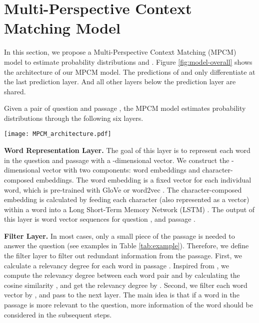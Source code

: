 \documentclass[11pt,letterpaper]{article}
\begin{document}
\section{Multi-Perspective Context Matching Model}
\label{sec:model}
In this section, we propose a Multi-Perspective Context Matching (MPCM) model to 
estimate probability distributions  and . 
Figure \ref{fig:model-overall} shows the architecture of our MPCM model. 
The predictions of  and  only differentiate at the last prediction layer.
And all other layers below the prediction layer are shared.

Given a pair of question  and passage , the MPCM model estimates probability distributions through the following six layers.

\begin{figure*}[tbp]
\begin{center}
\texttt{[image: MPCM\_architecture.pdf]}
\end{center}
\caption{Architecture for Multi-Perspective Context Matching Model.}
\label{fig:model-overall}
\end{figure*}


\textbf{Word Representation Layer.} The goal of this layer is to represent each word in the question and passage with a -dimensional vector. We construct the -dimensional vector with two components: word embeddings and character-composed embeddings. The word embedding is a fixed vector for each individual word, which is pre-trained with GloVe \cite{pennington2014glove} or word2vec \cite{mikolov2013distributed}. The character-composed embedding is calculated by feeding each character (also represented as a vector) within a word into a Long Short-Term Memory Network (LSTM) \cite{hochreiter1997long}. The output of this layer is word vector sequences for question , and passage .

\textbf{Filter Layer.} In most cases, only a small piece of the passage is needed to answer the question (see examples in Table \ref{tab:example}). Therefore, we define the filter layer to filter out redundant information from the passage. First, we calculate a relevancy degree  for each word  in passage . Inspired from , we compute the relevancy degree  between each word pair  and  by calculating the cosine similarity , and get the relevancy degree by .
Second, we filter each word vector by , and pass  to the next layer. The main idea is that if a word in the passage is more relevant to the question, more information of the word should be considered in the subsequent steps.
\end{document}
